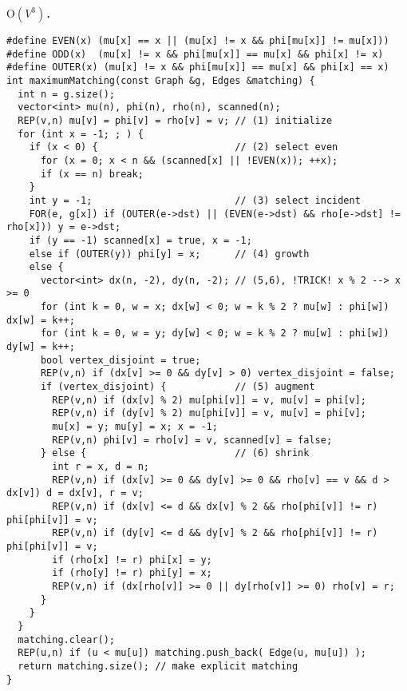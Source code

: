 $\mathrm{O}(V^3)$．

\begin{lstlisting}
#define EVEN(x) (mu[x] == x || (mu[x] != x && phi[mu[x]] != mu[x]))
#define ODD(x)  (mu[x] != x && phi[mu[x]] == mu[x] && phi[x] != x)
#define OUTER(x) (mu[x] != x && phi[mu[x]] == mu[x] && phi[x] == x)
int maximumMatching(const Graph &g, Edges &matching) {
  int n = g.size();
  vector<int> mu(n), phi(n), rho(n), scanned(n);
  REP(v,n) mu[v] = phi[v] = rho[v] = v; // (1) initialize
  for (int x = -1; ; ) {
    if (x < 0) {                        // (2) select even
      for (x = 0; x < n && (scanned[x] || !EVEN(x)); ++x);
      if (x == n) break;
    }
    int y = -1;                         // (3) select incident
    FOR(e, g[x]) if (OUTER(e->dst) || (EVEN(e->dst) && rho[e->dst] != rho[x])) y = e->dst;
    if (y == -1) scanned[x] = true, x = -1;
    else if (OUTER(y)) phi[y] = x;      // (4) growth
    else {
      vector<int> dx(n, -2), dy(n, -2); // (5,6), !TRICK! x % 2 --> x >= 0
      for (int k = 0, w = x; dx[w] < 0; w = k % 2 ? mu[w] : phi[w]) dx[w] = k++;
      for (int k = 0, w = y; dy[w] < 0; w = k % 2 ? mu[w] : phi[w]) dy[w] = k++;
      bool vertex_disjoint = true;
      REP(v,n) if (dx[v] >= 0 && dy[v] > 0) vertex_disjoint = false;
      if (vertex_disjoint) {            // (5) augment
        REP(v,n) if (dx[v] % 2) mu[phi[v]] = v, mu[v] = phi[v];
        REP(v,n) if (dy[v] % 2) mu[phi[v]] = v, mu[v] = phi[v];
        mu[x] = y; mu[y] = x; x = -1;
        REP(v,n) phi[v] = rho[v] = v, scanned[v] = false;
      } else {                          // (6) shrink
        int r = x, d = n;
        REP(v,n) if (dx[v] >= 0 && dy[v] >= 0 && rho[v] == v && d > dx[v]) d = dx[v], r = v;
        REP(v,n) if (dx[v] <= d && dx[v] % 2 && rho[phi[v]] != r) phi[phi[v]] = v;
        REP(v,n) if (dy[v] <= d && dy[v] % 2 && rho[phi[v]] != r) phi[phi[v]] = v;
        if (rho[x] != r) phi[x] = y;
        if (rho[y] != r) phi[y] = x;
        REP(v,n) if (dx[rho[v]] >= 0 || dy[rho[v]] >= 0) rho[v] = r;
      }
    }
  }
  matching.clear();
  REP(u,n) if (u < mu[u]) matching.push_back( Edge(u, mu[u]) );
  return matching.size(); // make explicit matching
}
\end{lstlisting}


\newpage
